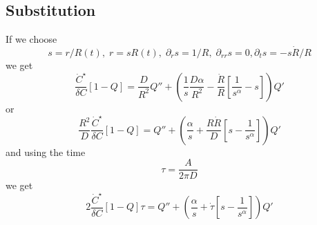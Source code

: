 \documentclass[11pt]{revtex4}
\begin{document}
\subsection{Substitution}
If we choose
\begin{equation}
	s = r/R(t),\; r = s R(t),\; \partial_r s = 1/R,\;\partial_{rr} s = 0, \partial_t s = - s \dot{R}/R
\end{equation}
we get
\begin{equation}
\dfrac{\dot{C}^\star}{\delta C} \left[1-Q\right] = \dfrac{D}{R^2} Q'' + 
\left( \dfrac{1}{s} \dfrac{D \alpha}{R^2} - \dfrac{\dot{R}}{R}\left[ \dfrac{1}{s^\alpha} - s \right]\right) Q'
\end{equation}
or
\begin{equation} 
\dfrac{R^2}{D}\dfrac{\dot{C}^\star}{\delta C} \left[1-Q\right] = Q'' + \left( \dfrac{\alpha}{s} + \dfrac{R\dot{R}}{D} \left[s-\dfrac{1}{s^\alpha}\right]\right) Q'
\end{equation}
and using the time
\begin{equation}
	\tau = \dfrac{A}{2\pi D}
\end{equation}
we get
\begin{equation}
	2\dfrac{\dot{C}^\star}{\delta C} \left[1-Q\right] \tau = Q'' + \left( \dfrac{\alpha}{s} + \dot{\tau} \left[s-\dfrac{1}{s^\alpha}\right]\right) Q'
\end{equation}
\end{document}
